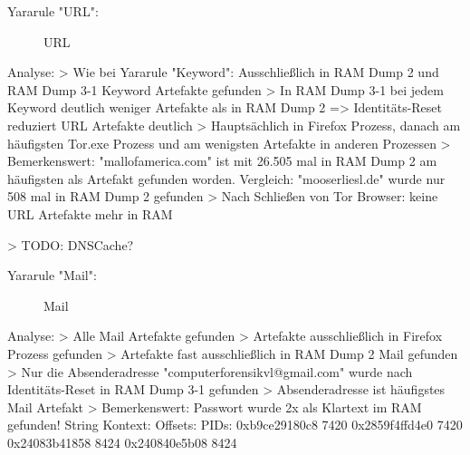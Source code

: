 Yararule "URL":
	\begin{figure}[h!]
		\centerline{}
		\label{chart:final-criteria}  
		\caption{URL}
	\end{figure}
	Analyse:
		> Wie bei Yararule "Keyword": Ausschließlich in RAM Dump 2 und RAM Dump 3-1 Keyword Artefakte gefunden
		> In RAM Dump 3-1 bei jedem Keyword deutlich weniger Artefakte als in RAM Dump 2 => Identitäts-Reset reduziert URL Artefakte deutlich
		> Hauptsächlich in Firefox Prozess, danach am häufigsten Tor.exe Prozess und am wenigsten Artefakte in anderen Prozessen
		> Bemerkenswert: "mallofamerica.com" ist mit 26.505 mal in RAM Dump 2 am häufigsten als Artefakt gefunden worden. Vergleich: "mooserliesl.de" wurde nur 508 mal in RAM Dump 2 gefunden
		> Nach Schließen von Tor Browser: keine URL Artefakte mehr in RAM
		
		> TODO: DNSCache?

Yararule "Mail":
	\begin{figure}[h!]
		\centerline{}
		\label{chart:final-criteria}  
		\caption{Mail}
	\end{figure}
	Analyse:
		> Alle Mail Artefakte gefunden
		> Artefakte ausschließlich in Firefox Prozess gefunden
		> Artefakte fast ausschließlich in RAM Dump 2 Mail gefunden
		> Nur die Absenderadresse "computerforensikvl@gmail.com" wurde nach Identitäts-Reset in RAM Dump 3-1 gefunden
		> Absenderadresse ist häufigstes Mail Artefakt
		> Bemerkenswert: Passwort wurde 2x als Klartext im RAM gefunden!
			String Kontext:
				Offsets:		PIDs:
				0xb9ce29180c8	7420
				0x2859f4ffd4e0	7420
				0x24083b41858	8424
				0x240840e5b08	8424
				
